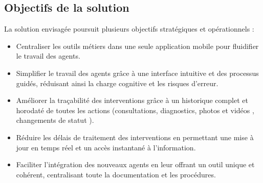 \documentclass[12pt,a4paper]{report}
\begin{document}
\subsection{ Objectifs de la solution } 
\noindent  La solution envisagée poursuit plusieurs objectifs stratégiques et opérationnels :
\begin{itemize}
\item Centraliser les outils métiers dans une seule application mobile pour fluidifier le travail des agents.
 \item  Simplifier le travail des agents grâce à une interface intuitive et des processus guidés, réduisant ainsi la charge cognitive et les risques d'erreur.  
\item  Améliorer la traçabilité des interventions grâce à un historique complet et horodaté de toutes les actions (consultations, diagnostics, photos et vidéos , changements de statut ).  
\item  Réduire les délais de traitement des interventions en permettant une mise à jour en temps réel et un accès instantané à l'information.    
\item Faciliter l'intégration des nouveaux agents en leur offrant un outil unique et cohérent, centralisant toute la documentation et les procédures.
\end{itemize}
\end{document}
